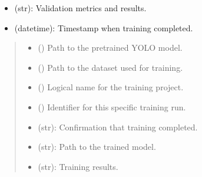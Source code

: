 \documentclass[letterpaper,10pt,english]{sphinxmanual}
\begin{document}
\begin{fulllineitems}
\begin{description}
\begin{itemize}
\item {} 
\sphinxAtStartPar
{} (str): Validation metrics and results.

\item {} 
\sphinxAtStartPar
{} (datetime): Timestamp when training completed.

\end{itemize}

\end{description}
\begin{quote}\begin{description}
\begin{itemize}
\item {} 
\sphinxAtStartPar
{} () \textendash{} Path to the pretrained YOLO model.

\item {} 
\sphinxAtStartPar
{} () \textendash{} Path to the dataset used for training.

\item {} 
\sphinxAtStartPar
{} () \textendash{} Logical name for the training project.

\item {} 
\sphinxAtStartPar
{} () \textendash{} Identifier for this specific training run.

\end{itemize}

\sphinxAtStartPar
\begin{description}
\begin{itemize}
\item {} 
\sphinxAtStartPar
{} (str): Confirmation that training completed.

\item {} 
\sphinxAtStartPar
{} (str): Path to the trained model.

\item {} 
\sphinxAtStartPar
{} (str): Training results.


\end{itemize}
\end{description}
\end{description}
\end{quote}
\end{fulllineitems}
\end{document}
